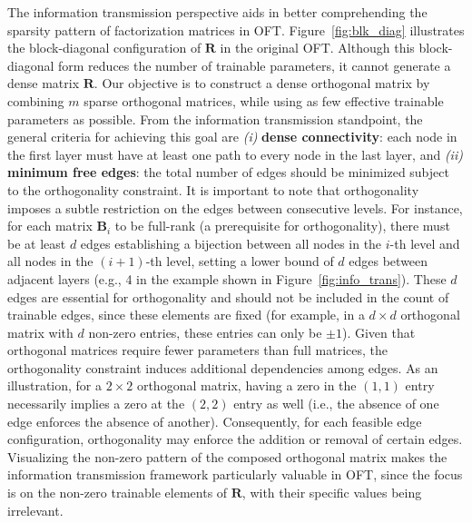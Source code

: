 The information transmission perspective aids in better comprehending the sparsity pattern of factorization matrices in OFT. Figure~\ref{fig:blk_diag} illustrates the block-diagonal configuration of $\bm{R}$ in the original OFT. Although this block-diagonal form reduces the number of trainable parameters, it cannot generate a dense matrix $\bm{R}$. Our objective is to construct a dense orthogonal matrix by combining $m$ sparse orthogonal matrices, while using as few effective trainable parameters as possible. From the information transmission standpoint, the general criteria for achieving this goal are \emph{(i)} \textbf{dense connectivity}: each node in the first layer must have at least one path to every node in the last layer, and \emph{(ii)} \textbf{minimum free edges}: the total number of edges should be minimized subject to the orthogonality constraint. It is important to note that orthogonality imposes a subtle restriction on the edges between consecutive levels. For instance, for each matrix $\bm{B}_i$ to be full-rank (a prerequisite for orthogonality), there must be at least $d$ edges establishing a bijection between all nodes in the $i$-th level and all nodes in the $(i+1)$-th level, setting a lower bound of $d$ edges between adjacent layers (e.g., 4 in the example shown in Figure~\ref{fig:info_trans}). These $d$ edges are essential for orthogonality and should not be included in the count of trainable edges, since these elements are fixed (for example, in a $d \times d$ orthogonal matrix with $d$ non-zero entries, these entries can only be $\pm 1$). Given that orthogonal matrices require fewer parameters than full matrices, the orthogonality constraint induces additional dependencies among edges. As an illustration, for a $2 \times 2$ orthogonal matrix, having a zero in the $(1,1)$ entry necessarily implies a zero at the $(2,2)$ entry as well (i.e., the absence of one edge enforces the absence of another). Consequently, for each feasible edge configuration, orthogonality may enforce the addition or removal of certain edges. Visualizing the non-zero pattern of the composed orthogonal matrix makes the information transmission framework particularly valuable in OFT, since the focus is on the non-zero trainable elements of $\bm{R}$, with their specific values being irrelevant.

